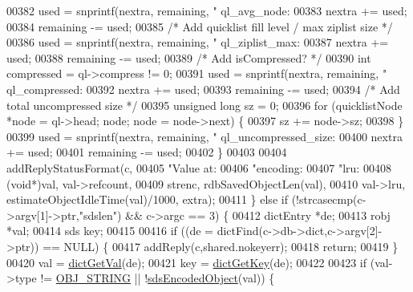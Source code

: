 \begin{DoxyCode}
{{{{{00382             used = snprintf(nextra, remaining, \textcolor{stringliteral}{" ql\_avg\_node:%
00383             nextra += used;
00384             remaining -= used;
00385             \textcolor{comment}{/* Add quicklist fill level / max ziplist size */}
00386             used = snprintf(nextra, remaining, \textcolor{stringliteral}{" ql\_ziplist\_max:%
00387             nextra += used;
00388             remaining -= used;
00389             \textcolor{comment}{/* Add isCompressed? */}
00390             \textcolor{keywordtype}{int} compressed = ql->compress != 0;
00391             used = snprintf(nextra, remaining, \textcolor{stringliteral}{" ql\_compressed:%
00392             nextra += used;
00393             remaining -= used;
00394             \textcolor{comment}{/* Add total uncompressed size */}
00395             \textcolor{keywordtype}{unsigned} \textcolor{keywordtype}{long} sz = 0;
00396             \textcolor{keywordflow}{for} (quicklistNode *node = ql->head; node; node = node->next) \{
00397                 sz += node->sz;
00398             \}
00399             used = snprintf(nextra, remaining, \textcolor{stringliteral}{" ql\_uncompressed\_size:%
00400             nextra += used;
00401             remaining -= used;
00402         \}
00403 
00404         addReplyStatusFormat(c,
00405             \textcolor{stringliteral}{"Value at:%
00406             \textcolor{stringliteral}{"encoding:%
00407             \textcolor{stringliteral}{"lru:%
00408             (\textcolor{keywordtype}{void}*)val, val->refcount,
00409             strenc, rdbSavedObjectLen(val),
00410             val->lru, estimateObjectIdleTime(val)/1000, extra);
00411     \} \textcolor{keywordflow}{else} \textcolor{keywordflow}{if} (!strcasecmp(c->argv[1]->ptr,\textcolor{stringliteral}{"sdslen"}) && c->argc == 3) \{
00412         dictEntry *de;
00413         robj *val;
00414         sds key;
00415 
00416         \textcolor{keywordflow}{if} ((de = dictFind(c->db->dict,c->argv[2]->ptr)) == NULL) \{
00417             addReply(c,shared.nokeyerr);
00418             \textcolor{keywordflow}{return};
00419         \}
00420         val = \hyperlink{dict_8h_ae8d2cc391873b2bea2b87c4f80f43120}{dictGetVal}(de);
00421         key = \hyperlink{dict_8h_a3271c334309904a3086deca94f96e46e}{dictGetKey}(de);
00422 
00423         \textcolor{keywordflow}{if} (val->type != \hyperlink{server_8h_a65236ea160f69cdef33ec942092af88f}{OBJ\_STRING} || !\hyperlink{server_8h_afcfb5bd97af52d1dbce331745cae030c}{sdsEncodedObject}(val)) \{
}}}}}}}}}}}}
\end{DoxyCode}
